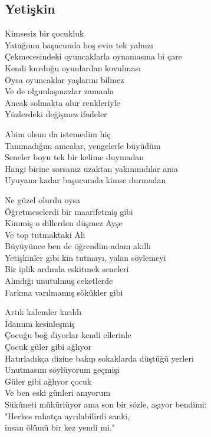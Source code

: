 \subsection{Yetişkin}

Kimsesiz bir çocukluk \\
Yatağının başucunda boş evin tek yalnızı \\
Çekmecesindeki oyuncaklarla oynamasına bi çare \\
Kendi kurduğu oyunlardan kovulması \\
Oysa oyuncaklar yaşlarını bilmez \\
Ve de olgunlaşmazlar zamanla \\
Ancak solmakta olur renkleriyle \\
Yüzlerdeki değişmez ifadeler

\noindent\newline
Abim olsun da istemedim hiç \\
Tanımadığım amcalar, yengelerle büyüdüm \\
Seneler boyu tek bir kelime duymadan \\
Hangi birine sorsanız uzaktan yakınımdılar ama \\
Uyuyana kadar başucumda kimse durmadan

\noindent\newline
Ne güzel olurdu oysa \\
Öğretmeselerdi bir maarifetmiş gibi \\
Kimmiş o dillerden düşmez Ayşe \\
Ve top tutmaktaki Ali \\
Büyüyünce ben de öğrendim adam akıllı \\
Yetişkinler gibi kin tutmayı, yalan söylemeyi \\
Bir iplik ardında eskitmek seneleri \\
Alındığı unutulmuş ceketlerde \\
Farkına varılmamış sökükler gibi

\noindent\newline
Artık kalemler kırıldı \\
İdamım kesinleşmiş \\
Çocuğu boğ diyorlar kendi ellerinle \\
Çocuk güler gibi ağlıyor \\
Hatırladıkça dizine bakıp sokaklarda düştüğü yerleri \\
Unutmasını söylüyorum geçmişi \\
Güler gibi ağlıyor çocuk \\
Ve ben eski günleri anıyorum \\
Sükûneti mühürlüyor ama son bir sözle, aşıyor bendimi: \\
	"Herkes rahatça ayrılabilirdi sanki, \\
		insan ölümü bir kez yendi mi."